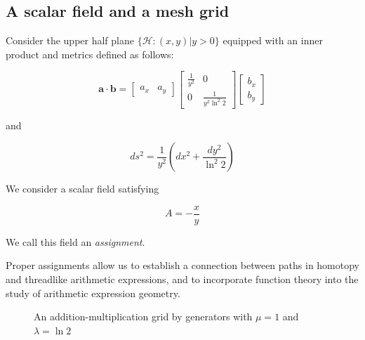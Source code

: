 \subsection{A scalar field and a mesh grid}\label{sec:meshgrid}

Consider the upper half plane $\{\mathcal{H}: (x, y) | y > 0 \}$ equipped with an inner product and metrics defined as follows:

$$
\mathbf{a} \cdot \mathbf{b} = \begin{bmatrix} a_x & a_y \end{bmatrix} \begin{bmatrix} \frac{1}{y^2} & 0 \\ 0 & \frac{1}{y^2 \ln^2 2} \end{bmatrix} \begin{bmatrix} b_x \\ b_y \end{bmatrix}
$$

and

$$
ds^2 = \frac{1}{y^2} (dx^2 + \frac{dy^2}{\ln^2 2})
$$

We consider a scalar field satisfying

\begin{equation}
A = - \frac{x}{y}
\end{equation}

We call this field an \emph{assignment}.

Proper assignments allow us to establish a connection between paths in homotopy and threadlike arithmetic expressions,
and to incorporate function theory into the study of arithmetic expression geometry.

\begin{figure}[ht]
\centering
{}
\caption{An addition-multiplication grid by generators with $\mu=1$ and $\lambda=\ln 2$}\label{fig:gridex0}
\end{figure}

